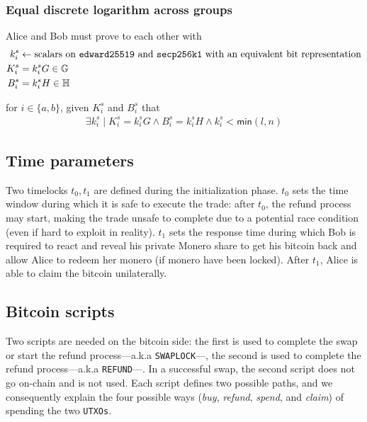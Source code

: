 \documentclass{llncs}
\newcommand{\GG}{\mathbb{G}}
\newcommand{\HH}{\mathbb{H}}
\begin{document}
\subsubsection{Equal discrete logarithm across groups}
Alice and Bob must prove to each other with
\begin{equation}
\begin{split}
    k^s_i &\leftarrow \text{scalars on \texttt{edward25519} and \texttt{secp256k1} with an equivalent bit representation} \\
    K^s_i &= k^s_iG \in \GG \\
    B^s_i &= k^s_iH \in \HH \\
\end{split}
\end{equation}

for $i \in \{a, b\}$, given $K^s_i$ and $B^s_i$ that
\begin{equation}
\begin{split}
    \exists k^s_i \mid K^s_i = k^s_iG \land B^s_i = k^s_iH \land k^s_i < \textsf{min}(l,n)
\end{split}
\end{equation}

\subsection{Time parameters}
Two timelocks $t_0, t_1$ are defined during the initialization phase. $t_0$ sets the time window during which it is safe to execute the trade: after $t_0$, the refund process may start, making the trade unsafe to complete due to a potential race condition (even if hard to exploit in reality). $t_1$ sets the response time during which Bob is required to react and reveal his private Monero share to get his bitcoin back and allow Alice to redeem her monero (if monero have been locked). After $t_1$, Alice is able to claim the bitcoin unilaterally.

\subsection{Bitcoin scripts}
Two scripts are needed on the bitcoin side: the first is used to complete the swap or start the refund process---a.k.a \texttt{SWAPLOCK}---, the second is used to complete the refund process---a.k.a \texttt{REFUND}---. In a successful swap, the second script does not go on-chain and is not used. Each script defines two possible paths, and we consequently explain the four possible ways (\textit{buy}, \textit{refund}, \textit{spend}, and \textit{claim}) of spending the two \texttt{UTXOs}.
\end{document}
